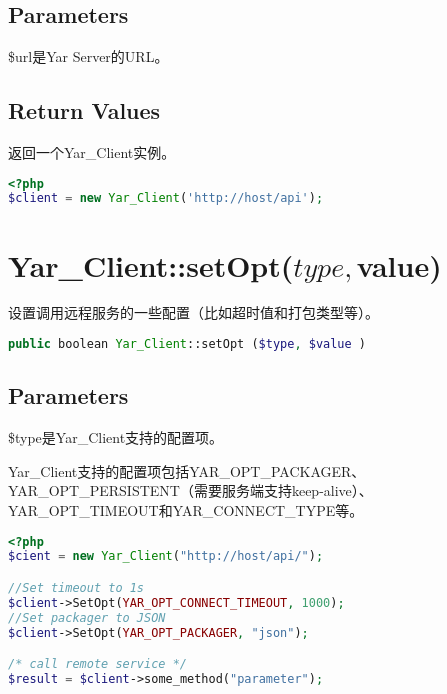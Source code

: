 \subsection{Parameters}


\begin{compactitem}
\item \$url是Yar Server的URL。
\end{compactitem}



\subsection{Return Values}

返回一个Yar\_Client实例。

\begin{lstlisting}[language=PHP]
<?php
$client = new Yar_Client('http://host/api');
\end{lstlisting}


\section{Yar\_Client::setOpt($type, $value)}

设置调用远程服务的一些配置（比如超时值和打包类型等）。

\begin{lstlisting}[language=PHP]
public boolean Yar_Client::setOpt ($type, $value )
\end{lstlisting}


\subsection{Parameters}

\begin{compactitem}
\item \$type是Yar\_Client支持的配置项。
\end{compactitem}

Yar\_Client支持的配置项包括YAR\_OPT\_PACKAGER、YAR\_OPT\_PERSISTENT（需要服务端支持keep-alive）、YAR\_OPT\_TIMEOUT和YAR\_CONNECT\_TYPE等。

\begin{lstlisting}[language=PHP]
<?php
$cient = new Yar_Client("http://host/api/");

//Set timeout to 1s
$client->SetOpt(YAR_OPT_CONNECT_TIMEOUT, 1000);
//Set packager to JSON
$client->SetOpt(YAR_OPT_PACKAGER, "json");

/* call remote service */
$result = $client->some_method("parameter");
\end{lstlisting}

